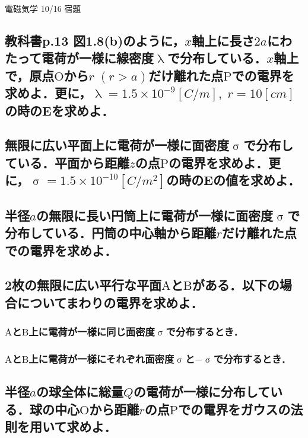 \documentclass[a4j,12pt]{jsarticle}
\begin{document}
\begin{center}
    \begin{LARGE}
        {\huge 電磁気学 10/16 宿題} 
    \end{LARGE}
\end{center}

\subsection{教科書p.13 図1.8(b)のように，\(x\)軸上に長さ\(2a\)にわたって電荷が一様に線密度\(\uplambda\)で分布している．\(x\)軸上で，原点\(\mathrm{O}\)から\(r\;(r>a)\)だけ離れた点\(\mathrm{P}\)での電界を求めよ．更に，\(\uplambda=1.5\times10^{-9}\si{[C/m]},\;r=10\si{[cm]}\)の時の\(\bm{E}\)を求めよ．}

\vspace{20em}

\subsection{無限に広い平面上に電荷が一様に面密度\(\upsigma\)で分布している．平面から距離\(z\)の点\(\mathrm{P}\)の電界を求めよ．更に，\(\upsigma=1.5\times10^{-10}\si{[C/m^2]}\)の時の\(\bm{E}\)の値を求めよ．}

\newpage

\subsection{半径\(a\)の無限に長い円筒上に電荷が一様に面密度\(\upsigma\)で分布している．円筒の中心軸から距離\(r\)だけ離れた点での電界を求めよ．}

\vspace{20em}

\subsection{2枚の無限に広い平行な平面\(\mathrm{A}\)と\(\mathrm{B}\)がある．以下の場合についてまわりの電界を求めよ．}
\subsubsection{\(\mathrm{A}\)と\(\mathrm{B}\)上に電荷が一様に同じ面密度\(\upsigma\)で分布するとき．}
\vspace{12em}

\subsubsection{\(\mathrm{A}\)と\(\mathrm{B}\)上に電荷が一様にそれぞれ面密度\(\upsigma\)と\(-\upsigma\)で分布するとき．}
\newpage

\subsection{半径\(a\)の球全体に総量\(Q\)の電荷が一様に分布している．球の中心\(\mathrm{O}\)から距離\(r\)の点\(\mathrm{P}\)での電界をガウスの法則を用いて求めよ．}
\end{document}
